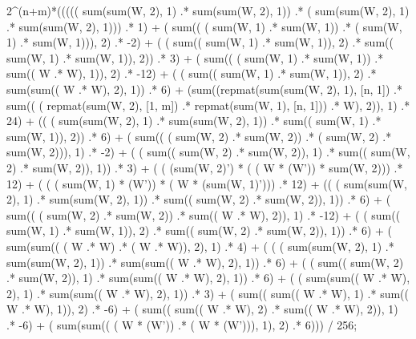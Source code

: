 \documentclass[]{article}
\begin{document}
             2\^{}(n+m)*((((( sum(sum(W, 2), 1) .* sum(sum(W, 2), 1))  .* ( sum(sum(W, 2), 1) .* sum(sum(W, 2), 1)))  .* 1)  
              + ( sum(( ( sum(W, 1) .* sum(W, 1)) .* ( sum(W, 1) .* sum(W, 1))), 2) .* -2)  
              + ( ( sum(( sum(W, 1) .* sum(W, 1)), 2) .* sum(( sum(W, 1) .* sum(W, 1)), 2)) .* 3)  
              + ( sum(( ( sum(W, 1) .* sum(W, 1)) .* sum(( W .* W), 1)), 2) .* -12)  
              + ( ( sum(( sum(W, 1) .* sum(W, 1)), 2) .* sum(sum(( W .* W), 2), 1)) .* 6)  
              + (sum((repmat(sum(sum(W, 2), 1), [n, 1])  .* sum(( ( repmat(sum(W, 2), [1, m]) .* repmat(sum(W, 1), [n, 1])) .* W), 2)), 1)  .* 24)  
              + (( ( sum(sum(W, 2), 1) .* sum(sum(W, 2), 1)) .* sum(( sum(W, 1) .* sum(W, 1)), 2))  .* 6)  
              + ( sum(( ( sum(W, 2) .* sum(W, 2)) .* ( sum(W, 2) .* sum(W, 2))), 1) .* -2)  
              + ( ( sum(( sum(W, 2) .* sum(W, 2)), 1) .* sum(( sum(W, 2) .* sum(W, 2)), 1)) .* 3)  
              + ( ( (sum(W, 2)') * ( ( W * (W')) * sum(W, 2))) .* 12)  
              + ( ( ( sum(W, 1) * (W')) * ( W * (sum(W, 1)'))) .* 12)  
              + (( ( sum(sum(W, 2), 1) .* sum(sum(W, 2), 1)) .* sum(( sum(W, 2) .* sum(W, 2)), 1))  .* 6)  
              + ( sum(( ( sum(W, 2) .* sum(W, 2)) .* sum(( W .* W), 2)), 1) .* -12)  
              + ( ( sum(( sum(W, 1) .* sum(W, 1)), 2) .* sum(( sum(W, 2) .* sum(W, 2)), 1)) .* 6)  
              + ( sum(sum(( ( W .* W) .* ( W .* W)), 2), 1) .* 4)  
              + ( ( ( sum(sum(W, 2), 1) .* sum(sum(W, 2), 1)) .* sum(sum(( W .* W), 2), 1)) .* 6)  
              + ( ( sum(( sum(W, 2) .* sum(W, 2)), 1) .* sum(sum(( W .* W), 2), 1)) .* 6)  
              + ( ( sum(sum(( W .* W), 2), 1) .* sum(sum(( W .* W), 2), 1)) .* 3)  
              + ( sum(( sum(( W .* W), 1) .* sum(( W .* W), 1)), 2) .* -6)  
              + ( sum(( sum(( W .* W), 2) .* sum(( W .* W), 2)), 1) .* -6)   
              + ( sum(sum(( ( W * (W')) .* ( W * (W'))), 1), 2) .* 6))) / 256;
\end{document}
